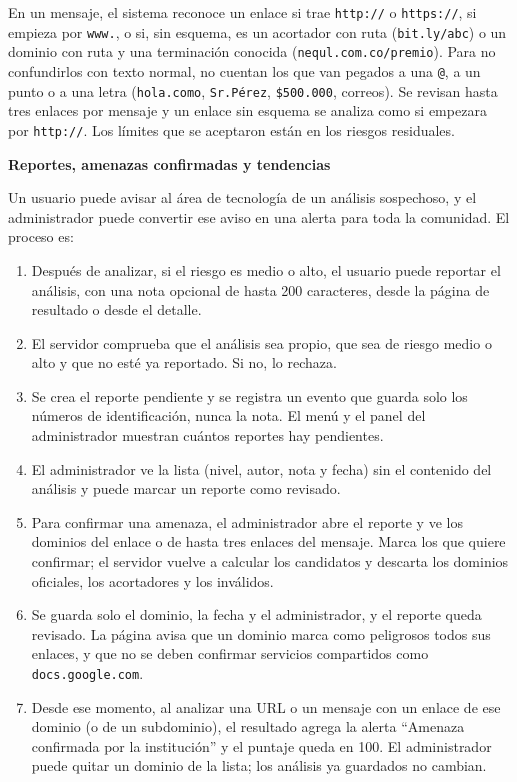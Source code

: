 \documentclass[journal,onecolumn,12pt,draftclsnofoot]{IEEEtran}
\newcommand{\apartado}[1]{\par\medskip\noindent\textbf{#1}\par\smallskip}
\begin{document}
En un mensaje, el sistema reconoce un enlace si trae \texttt{http://} o \texttt{https://}, si empieza por \texttt{www.}, o si, sin esquema, es un acortador con ruta (\texttt{bit.ly/abc}) o un dominio con ruta y una terminación conocida (\texttt{nequl.com.co/premio}). Para no confundirlos con texto normal, no cuentan los que van pegados a una \texttt{@}, a un punto o a una letra (\texttt{hola.como}, \texttt{Sr.Pérez}, \texttt{\$500.000}, correos). Se revisan hasta tres enlaces por mensaje y un enlace sin esquema se analiza como si empezara por \texttt{http://}. Los límites que se aceptaron están en los riesgos residuales.

\apartado{Reportes, amenazas confirmadas y tendencias}

Un usuario puede avisar al área de tecnología de un análisis sospechoso, y el administrador puede convertir ese aviso en una alerta para toda la comunidad. El proceso es:

\begin{enumerate}
  \item Después de analizar, si el riesgo es medio o alto, el usuario puede reportar el análisis, con una nota opcional de hasta 200 caracteres, desde la página de resultado o desde el detalle.
  \item El servidor comprueba que el análisis sea propio, que sea de riesgo medio o alto y que no esté ya reportado. Si no, lo rechaza.
  \item Se crea el reporte pendiente y se registra un evento que guarda solo los números de identificación, nunca la nota. El menú y el panel del administrador muestran cuántos reportes hay pendientes.
  \item El administrador ve la lista (nivel, autor, nota y fecha) sin el contenido del análisis y puede marcar un reporte como revisado.
  \item Para confirmar una amenaza, el administrador abre el reporte y ve los dominios del enlace o de hasta tres enlaces del mensaje. Marca los que quiere confirmar; el servidor vuelve a calcular los candidatos y descarta los dominios oficiales, los acortadores y los inválidos.
  \item Se guarda solo el dominio, la fecha y el administrador, y el reporte queda revisado. La página avisa que un dominio marca como peligrosos todos sus enlaces, y que no se deben confirmar servicios compartidos como \texttt{docs.google.com}.
  \item Desde ese momento, al analizar una URL o un mensaje con un enlace de ese dominio (o de un subdominio), el resultado agrega la alerta ``Amenaza confirmada por la institución'' y el puntaje queda en 100. El administrador puede quitar un dominio de la lista; los análisis ya guardados no cambian.
\end{enumerate}
\end{document}
